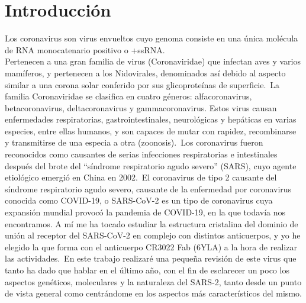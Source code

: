 \documentclass[a4paper,11pt]{report}
\begin{document}
 \section{Introducción}
 Los coronavirus son virus envueltos cuyo genoma consiste en una única molécula de RNA monocatenario positivo o +ssRNA. \\Pertenecen a una gran familia de virus (Coronaviridae) que infectan aves y varios mamíferos, y pertenecen a los Nidovirales, denominados así debido al aspecto similar a una corona solar conferido por sus glicoproteínas de superficie.\ La familia Coronaviridae se clasifica en cuatro géneros: alfacoronavirus, betacoronavirus, deltacoronavirus y gammacoronavirus. Estos virus causan enfermedades respiratorias, gastrointestinales, neurológicas y hepáticas en varias especies, entre ellas humanos, y son capaces de mutar con rapidez, recombinarse y transmitirse de una especia a otra (zoonosis).\
Los coronavirus fueron reconocidos como causantes de serias infecciones respiratorias e intestinales después del brote del “síndrome respiratorio agudo severo” (SARS), cuyo agente etiológico emergió en China en 2002.\
El coronavirus de tipo 2 causante del síndrome respiratorio agudo severo, causante de la enfermedad por coronavirus conocida como COVID-19, o SARS-CoV-2 es un tipo de coronavirus cuya expansión mundial provocó la pandemia de COVID-19, en la que todavía nos encontramos.
A mí me ha tocado estudiar la estructura cristalina del dominio de unión al receptor del SARS-CoV-2 en complejo con distintos anticuerpos, y yo he elegido la que forma con el anticuerpo CR3022 Fab (6YLA) a la hora de realizar las actividades.\
En este trabajo realizaré una pequeña revisión de este virus que tanto ha dado que hablar en el último año, con el fin de esclarecer un poco los aspectos genéticos, moleculares y la naturaleza del SARS-2, tanto desde un punto de vista general como centrándome en los aspectos más característicos del mismo.
\end{document}
